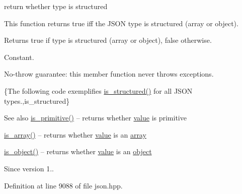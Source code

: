 return whether type is structured 

This function returns true iff the J\+S\+ON type is structured (array or object).

\begin{DoxyReturn}{Returns}
{\ttfamily true} if type is structured (array or object), {\ttfamily false} otherwise.
\end{DoxyReturn}
Constant.

No-\/throw guarantee\+: this member function never throws exceptions.

\{The following code exemplifies {\ttfamily \hyperlink{classnlohmann_1_1basic__json_a9f68a0af820c3ced7f9d17851ce4c22d}{is\+\_\+structured()}} for all J\+S\+ON types.,is\+\_\+structured\}

\begin{DoxySeeAlso}{See also}
\hyperlink{classnlohmann_1_1basic__json_a6362b88718eb5c6d4fed6a61eed44b95}{is\+\_\+primitive()} -- returns whether \hyperlink{classnlohmann_1_1basic__json_a9fa223b26419f018f9b18cc516e3a8e5}{value} is primitive 

\hyperlink{classnlohmann_1_1basic__json_aef9ce5dd2381caee1f8ddcdb5bdd9c65}{is\+\_\+array()} -- returns whether \hyperlink{classnlohmann_1_1basic__json_a9fa223b26419f018f9b18cc516e3a8e5}{value} is an \hyperlink{classnlohmann_1_1basic__json_aa80485befaffcadaa39965494e0b4d2e}{array} 

\hyperlink{classnlohmann_1_1basic__json_af8f511af124e82e4579f444b4175787c}{is\+\_\+object()} -- returns whether \hyperlink{classnlohmann_1_1basic__json_a9fa223b26419f018f9b18cc516e3a8e5}{value} is an \hyperlink{classnlohmann_1_1basic__json_aa13f7c0615867542ce80337cbcf13ada}{object}
\end{DoxySeeAlso}
\begin{DoxySince}{Since}
version 1.. 
\end{DoxySince}


Definition at line 9088 of file json.\+hpp.


